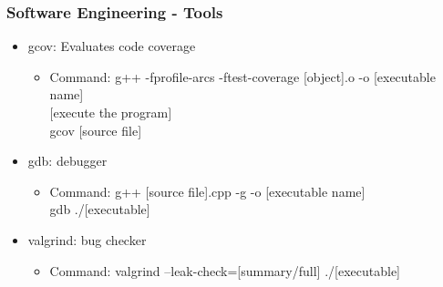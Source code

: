 \begin{frame}\frametitle{Software Engineering - Tools}
\begin{itemize}
\item gcov: Evaluates code coverage
	\begin{itemize}
	\item Command: g++ -fprofile-arcs -ftest-coverage [object].o -o [executable name]\\
	$[$execute the program$]$\\
	gcov [source file]
	\end{itemize}
\item gdb: debugger
	\begin{itemize}
	\item Command: g++ [source file].cpp -g -o [executable name]\\
	gdb ./[executable]
	\end{itemize}
\item valgrind: bug checker
	\begin{itemize}
	\item Command: valgrind --leak-check=[summary/full] ./[executable]
	\end{itemize}
\end{itemize}
\end{frame}
